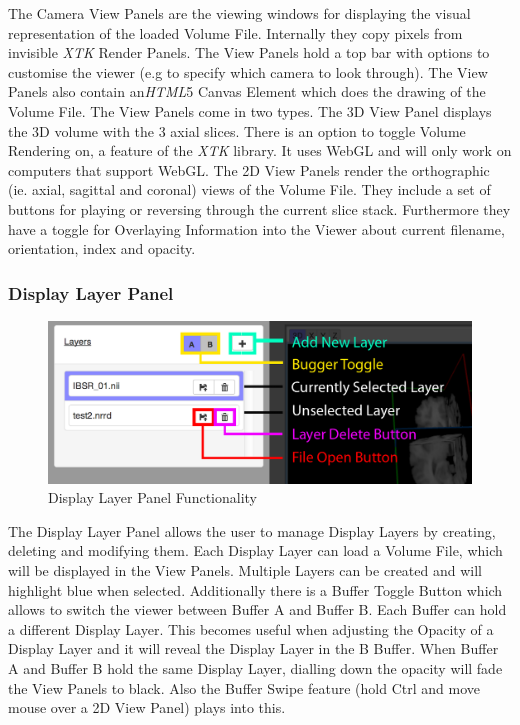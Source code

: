 \documentclass[a4paper,11pt,twoside]{article}
\begin{document}
The Camera View Panels are the viewing windows for displaying the visual representation of the loaded Volume File. Internally they copy pixels from invisible \textit{XTK} Render Panels. The View Panels hold a top bar with options to customise the viewer (e.g to specify which camera to look through). The View Panels also contain an\textit{HTML}5 Canvas Element which does the drawing of the Volume File. The View Panels come in two types. The 3D View Panel displays the 3D volume with the 3 axial slices. There is an option to toggle Volume Rendering on, a feature of the \textit{XTK} library. It uses WebGL and will only work on computers that support WebGL. The 2D View Panels render the orthographic (ie. axial, sagittal and coronal) views of the Volume File. They include a set of buttons for playing or reversing through the current slice stack. Furthermore they have a toggle for Overlaying Information into the Viewer about current filename, orientation, index and opacity.




\subsubsection{Display Layer Panel}

\begin{figure}[ht!]
\centering
\includegraphics[width=140mm]{graphics/features_03.png}
\caption{Display Layer Panel Functionality}
\label{fig:UIdesign1}
\end{figure}

The Display Layer Panel allows the user to manage Display Layers by creating, deleting and modifying them. Each Display Layer can load a Volume File, which will be displayed in the View Panels. Multiple Layers can be created and will highlight blue when selected. Additionally there is a Buffer Toggle Button which allows to switch the viewer between Buffer A and Buffer B. Each Buffer can hold a different Display Layer. This becomes useful when adjusting the Opacity of a Display Layer and it will reveal the Display Layer in the B Buffer. When Buffer A and Buffer B hold the same Display Layer, dialling down the opacity will fade the View Panels to black. Also the Buffer Swipe feature (hold Ctrl and move mouse over a 2D View Panel) plays into this.
\end{document}
